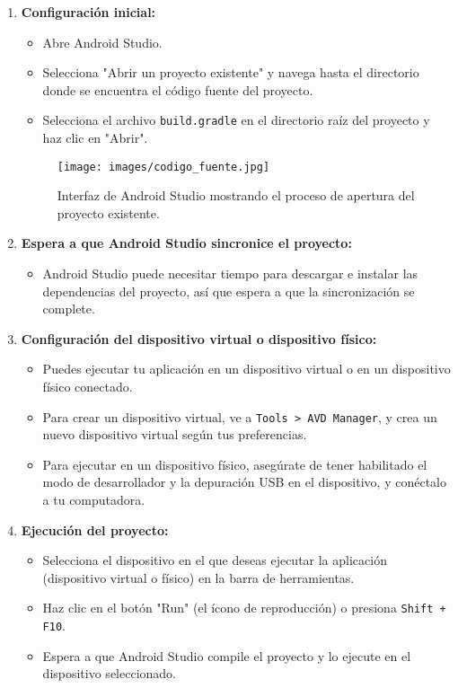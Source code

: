 \documentclass{article}
\begin{document}
    \begin{enumerate}
        \item \textbf{Configuración inicial:}
            \begin{itemize}
                \item Abre Android Studio.
                \item Selecciona "Abrir un proyecto existente" y navega hasta el directorio donde se encuentra el código fuente del proyecto.
                \item Selecciona el archivo \texttt{build.gradle} en el directorio raíz del proyecto y haz clic en "Abrir".
            \end{itemize}

            \begin{figure}[h]
                \centering
                \texttt{[image: images/codigo\_fuente.jpg]}
                \caption{Interfaz de Android Studio mostrando el proceso de apertura del proyecto existente.}
                \label{fig:codigo_fuente}
            \end{figure}

        \item \textbf{Espera a que Android Studio sincronice el proyecto:}
            \begin{itemize}
                \item Android Studio puede necesitar tiempo para descargar e instalar las dependencias del proyecto, así que espera a que la sincronización se complete.
            \end{itemize}

        \item \textbf{Configuración del dispositivo virtual o dispositivo físico:}
            \begin{itemize}
                \item Puedes ejecutar tu aplicación en un dispositivo virtual o en un dispositivo físico conectado.
                \item Para crear un dispositivo virtual, ve a \texttt{Tools > AVD Manager}, y crea un nuevo dispositivo virtual según tus preferencias.
                \item Para ejecutar en un dispositivo físico, asegúrate de tener habilitado el modo de desarrollador y la depuración USB en el dispositivo, y conéctalo a tu computadora.
            \end{itemize}

        \item \textbf{Ejecución del proyecto:}
            \begin{itemize}
                \item Selecciona el dispositivo en el que deseas ejecutar la aplicación (dispositivo virtual o físico) en la barra de herramientas.
                \item Haz clic en el botón "Run" (el ícono de reproducción) o presiona \texttt{Shift + F10}.
                \item Espera a que Android Studio compile el proyecto y lo ejecute en el dispositivo seleccionado.
            \end{itemize}
    \end{enumerate}
\end{document}
